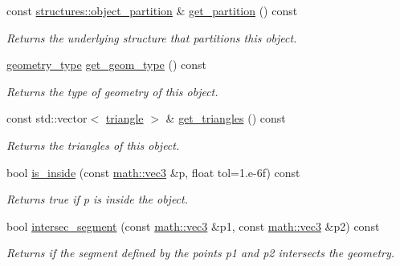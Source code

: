 \begin{DoxyCompactItemize}
const \hyperlink{classphysim_1_1structures_1_1object__partition}{structures\+::object\+\_\+partition} \& \hyperlink{classphysim_1_1geometry_1_1object_a06967c0a6b95553a2aabce18521ada91}{get\+\_\+partition} () const
\begin{DoxyCompactList}\small\item\em Returns the underlying structure that partitions this object. \end{DoxyCompactList}\item 
\mbox{\label{classphysim_1_1geometry_1_1object_ad6175b872f3cd0aaf655e5e954e1a688}} 
\hyperlink{namespacephysim_1_1geometry_a60e1ee7ea6f443f8ec9341ca7f12f1b7}{geometry\+\_\+type} \hyperlink{classphysim_1_1geometry_1_1object_ad6175b872f3cd0aaf655e5e954e1a688}{get\+\_\+geom\+\_\+type} () const
\begin{DoxyCompactList}\small\item\em Returns the type of geometry of this object. \end{DoxyCompactList}\item 
const std\+::vector$<$ \hyperlink{classphysim_1_1geometry_1_1triangle}{triangle} $>$ \& \hyperlink{classphysim_1_1geometry_1_1object_a428740c7adc7d17fa4402d06f18f5c4a}{get\+\_\+triangles} () const
\begin{DoxyCompactList}\small\item\em Returns the triangles of this object. \end{DoxyCompactList}\item 
bool \hyperlink{classphysim_1_1geometry_1_1object_a93f6efc676b892f47b40434c152c610f}{is\+\_\+inside} (const \hyperlink{structphysim_1_1math_1_1vec3}{math\+::vec3} \&p, float tol=1.e-\/6f) const
\begin{DoxyCompactList}\small\item\em Returns true if {\itshape p} is inside the object. \end{DoxyCompactList}\item 
bool \hyperlink{classphysim_1_1geometry_1_1object_a515c3086c4f29513ca217855ecef3639}{intersec\+\_\+segment} (const \hyperlink{structphysim_1_1math_1_1vec3}{math\+::vec3} \&p1, const \hyperlink{structphysim_1_1math_1_1vec3}{math\+::vec3} \&p2) const
\begin{DoxyCompactList}\small\item\em Returns if the segment defined by the points {\itshape p1} and {\itshape p2} intersects the geometry. \end{DoxyCompactList}\item 

\end{DoxyCompactItemize}

